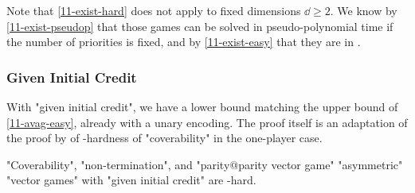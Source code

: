 Note that \cref{11-exist-hard} does not apply to fixed dimensions
$\dd\geq 2$.  We know by \cref{11-exist-pseudop} that those games can
be solved in pseudo-polynomial time if the number of priorities is
fixed, and by \cref{11-exist-easy} that they are in \coNP.

\subsubsection{Given Initial Credit}
With "given initial credit", we have a lower bound matching the
\kEXP[2] upper bound of \cref{11-avag-easy}, already with a unary
encoding.  The proof itself is an adaptation of the proof by
 of \EXPSPACE-hardness of "coverability" in
the one-player case.

\begin{theorem}\label{11-avag-hard}
  "Coverability", "non-termination", and "parity@parity vector game"
  "asymmetric" "vector games" with "given initial credit" are
  \kEXP[2]-hard.
\end{theorem}

